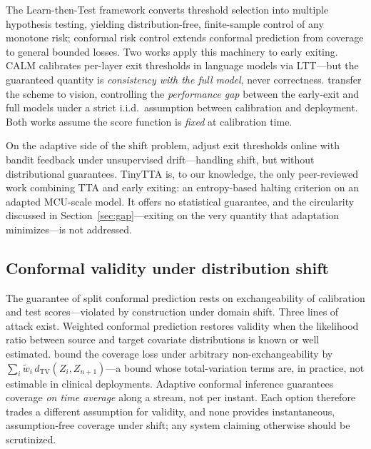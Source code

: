 \documentclass[preprint,12pt]{elsarticle}
\begin{document}
The Learn-then-Test framework \citep{angelopoulos2025ltt} converts threshold selection into multiple hypothesis testing, yielding distribution-free, finite-sample control of any monotone risk; conformal risk control \citep{angelopoulos2024crc} extends conformal prediction from coverage to general bounded losses. Two works apply this machinery to early exiting. CALM \citep{schuster2022calm} calibrates per-layer exit thresholds in language models via LTT---but the guaranteed quantity is \emph{consistency with the full model}, never correctness. \citet{jazbec2024fast} transfer the scheme to vision, controlling the \emph{performance gap} between the early-exit and full models under a strict i.i.d.\ assumption between calibration and deployment. Both works assume the score function is \emph{fixed} at calibration time.

On the adaptive side of the shift problem, \citet{bajpai2025greedy} adjust exit thresholds online with bandit feedback under unsupervised drift---handling shift, but without distributional guarantees. TinyTTA \citep{jia2024tinytta} is, to our knowledge, the only peer-reviewed work combining TTA and early exiting: an entropy-based halting criterion on an adapted MCU-scale model. It offers no statistical guarantee, and the circularity discussed in Section~\ref{sec:gap}---exiting on the very quantity that adaptation minimizes---is not addressed.

\subsection{Conformal validity under distribution shift}

The guarantee of split conformal prediction rests on exchangeability of calibration and test scores---violated by construction under domain shift. Three lines of attack exist. Weighted conformal prediction \citep{tibshirani2019covariate} restores validity when the likelihood ratio between source and target covariate distributions is known or well estimated. \citet{barber2023beyond} bound the coverage loss under arbitrary non-exchangeability by $\sum_i \tilde w_i\, d_{\mathrm{TV}}(Z_i, Z_{n+1})$---a bound whose total-variation terms are, in practice, not estimable in clinical deployments. Adaptive conformal inference \citep{gibbs2021adaptive} guarantees coverage \emph{on time average} along a stream, not per instant. Each option therefore trades a different assumption for validity, and none provides instantaneous, assumption-free coverage under shift; any system claiming otherwise should be scrutinized.
\end{document}
